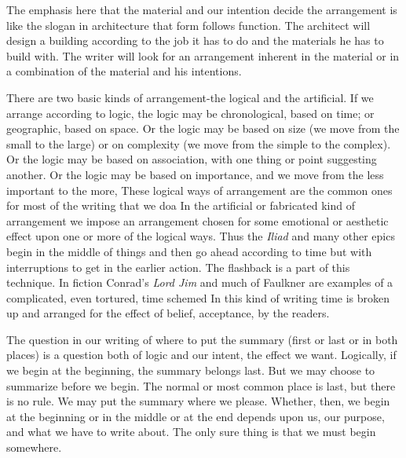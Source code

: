 \documentclass[
    oneside,
    11pt,
    draft
]{memoir}
\begin{document}
The emphasis here that the material and our intention decide the arrangement is like the slogan in architecture that form follows function. The architect will design a building according to the job it has to do and the materials he has to build with. The writer will look for an arrangement inherent in the material or in a combination of the material and his intentions. 

There are two basic kinds of arrangement-the logical and the artificial. If we arrange according to logic, the logic may be chronological, based on time; or geographic, based on space. Or the logic may be based on size (we move from the small to the large) or on complexity (we move from the simple to the complex). Or the logic may be based on association, with one thing or point suggesting another. Or the logic may be based on importance, and we move from the less important to the more, These logical ways of arrangement are the common ones for most of the writing that we doa In the artificial or fabricated kind of arrangement we impose an arrangement chosen for some emotional or aesthetic effect upon one or more of the logical ways. Thus the \emph{Iliad} and many other epics begin in the middle of things and then go ahead according to time but with interruptions to get in the earlier action. The flashback is a part of this technique. In fiction Conrad's \emph{Lord Jim} and much of Faulkner are examples of a complicated, even tortured, time schemed In this kind of writing time is broken up and arranged for the effect of belief, acceptance, by the readers. 

The question in our writing of where to put the summary (first or last or in both places) is a question both of logic and our intent, the effect we want. Logically, if we begin at the beginning, the summary belongs last. But we may choose to summarize before we begin. The normal or most common place is last, but there is no rule. We may put the summary where we please. Whether, then, we begin at the beginning or in the middle or at the end depends upon us, our purpose, and what we have to write about. The only sure thing is that we must begin somewhere.
\end{document}
